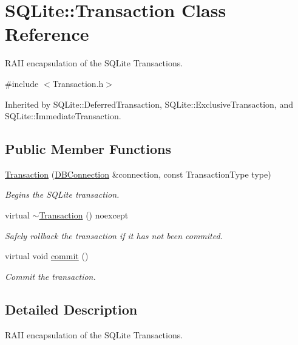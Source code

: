 \hypertarget{a00009}{\section{S\-Q\-Lite\-:\-:Transaction Class Reference}
\label{a00009}
}


R\-A\-I\-I encapsulation of the S\-Q\-Lite Transactions.  




{\ttfamily \#include $<$Transaction.\-h$>$}



Inherited by S\-Q\-Lite\-::\-Deferred\-Transaction, S\-Q\-Lite\-::\-Exclusive\-Transaction, and S\-Q\-Lite\-::\-Immediate\-Transaction.

\subsection*{Public Member Functions}
\begin{DoxyCompactItemize}
\item 
\hyperlink{a00009_a27add1a1db2dd8cd5935c78a63ad556b}{Transaction} (\hyperlink{a00002}{D\-B\-Connection} \&connection, const Transaction\-Type type)
\begin{DoxyCompactList}\small\item\em Begins the S\-Q\-Lite transaction. \end{DoxyCompactList}\item 
\hypertarget{a00009_a43c5e67a10b9698b7f6dad73539feb94}{virtual \hyperlink{a00009_a43c5e67a10b9698b7f6dad73539feb94}{$\sim$\-Transaction} () noexcept}\label{a00009_a43c5e67a10b9698b7f6dad73539feb94}

\begin{DoxyCompactList}\small\item\em Safely rollback the transaction if it has not been commited. \end{DoxyCompactList}\item 
\hypertarget{a00009_a9b251d84198cdc2c0208ad566fec0287}{virtual void \hyperlink{a00009_a9b251d84198cdc2c0208ad566fec0287}{commit} ()}\label{a00009_a9b251d84198cdc2c0208ad566fec0287}

\begin{DoxyCompactList}\small\item\em Commit the transaction. \end{DoxyCompactList}\end{DoxyCompactItemize}


\subsection{Detailed Description}
R\-A\-I\-I encapsulation of the S\-Q\-Lite Transactions. 

